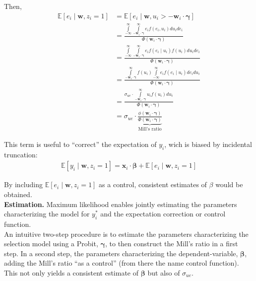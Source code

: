 \noindent Then,
\begin{align}
	\mathbb{E} \left[ e_i \mid \bm{w}, z_i = 1 \right] & = \mathbb{E} \left[ e_i \mid \bm{w}, u_i > - \bm{w}_i \cdot \bm{\gamma} \right] \nonumber \\ 
	& = \frac{ \int \limits _{-\infty} ^{\infty} \int \limits _{-\bm{w}_i \cdot \bm{\gamma}} ^{\infty} e_i f \left( e_i, u_i \right) du_i de_i}{ \Phi \left( \bm{w}_i \cdot \bm{\gamma} \right)  } \nonumber \\
	& = \frac{ \int \limits _{-\infty} ^{\infty} \int \limits _{-\bm{w}_i \cdot \bm{\gamma}} ^{\infty} e_i f \left( e_i \mid  u_i \right) f \left( u_i \right)  du_i de_i}{ \Phi \left( \bm{w}_i \cdot \bm{\gamma} \right)  } \nonumber \\
	& = \frac{ \int \limits _{-\bm{w}_i \cdot \bm{\gamma}} ^{\infty} f \left( u_i \right)  \int \limits _{-\infty} ^{\infty} e_i f \left( e_i \mid  u_i \right) de_i du_i}{ \Phi \left( \bm{w}_i \cdot \bm{\gamma} \right)  } \nonumber \\
	& = \frac{ \sigma_{ue} \cdot \int \limits _{-\bm{w}_i \cdot \bm{\gamma}} ^{\infty} u_i f \left( u_i \right)  du_i}{ \Phi \left( \bm{w}_i \cdot \bm{\gamma} \right)  } \nonumber \\
	& = \sigma_{ue} \cdot \underbrace{ \frac{ \phi \left( \bm{w}_i \cdot \bm{\gamma} \right) } { \Phi \left( \bm{w}_i \cdot \bm{\gamma} \right) } }_{\text{Mill's ratio}}
\end{align}

\noindent This term is useful to ``correct'' the expectation of $y_i$, wich is biased by incidental truncation: 
\begin{align}
	\mathbb{E} \left[ y_i \mid \bm{w}, z_i = 1 \right] = \bm{x}_i \cdot \bm{\beta} + \mathbb{E} \left[ e_i \mid \bm{w}, z_i = 1 \right]
\end{align}

\noindent By including $\mathbb{E} \left[ e_i \mid \bm{w}, z_i = 1 \right]$ as a control, consistent estimates of $\beta$ would be obtained.\\

\noindent \textbf{Estimation.} Maximum likelihood enables jointly estimating the parameters characterizing the model for $y_i^*$ and the expectation correction or control function.\\

\noindent An intuitive two-step procedure is to estimate the parameters characterizing the selection model using a Probit, $\bm{\gamma}$, to then construct the Mill's ratio in a first step. In a second step, the parameters characterizing the dependent-variable, $\bm{\beta}$, adding the Mill's ratio ``as a control'' (from there the name control function). This not only yields a consistent estimate of $\bm{\beta}$ but also of $\sigma_{ue}$.\\

